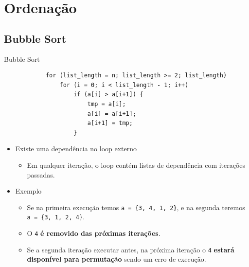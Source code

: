 \section{Ordenação}
	\subsection{Bubble Sort}
	\begin{frame}[fragile]{Bubble Sort}
		\begin{verbatim}
			for (list_length = n; list_length >= 2; list_length) 
				for (i = 0; i < list_length - 1; i++)
					if (a[i] > a[i+1]) { 
						tmp = a[i];
						a[i] = a[i+1];
						a[i+1] = tmp;
					}
		\end{verbatim}
					\pause
		\begin{itemize}
			\item Existe uma dependência no loop externo
			\begin{itemize}
				\item Em qualquer iteração, o loop contém listas de dependência com iterações passadas.
			\end{itemize}
			\item Exemplo
			\begin{itemize}
				\item Se na primeira execução temos {\tt a = \{3, 4, 1, 2\}}, e na segunda teremos {\tt a = \{3, 1, 2, 4\}}.
						\pause
				\item O \texttt{4} \textbf{é removido das próximas iterações}.
						\bigskip
						\pause
				\item Se a segunda iteração executar antes, na próxima iteração o \texttt{4} \textbf{estará disponível para permutação} sendo um erro de execução.
			\end{itemize}
		\end{itemize}
\end{frame}


